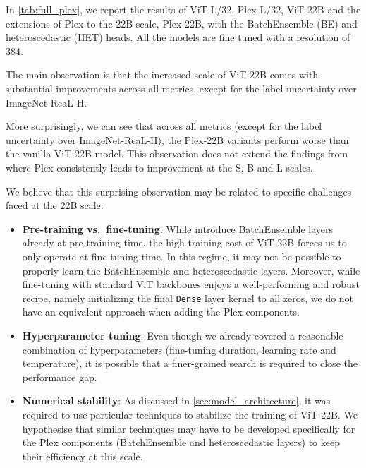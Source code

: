 \documentclass{article}
\begin{document}
In \cref{tab:full_plex}, we report the results of ViT-L/32, Plex-L/32, ViT-22B and the extensions of Plex to the 22B scale, Plex-22B, with the BatchEnsemble (BE) and heteroscedastic (HET) heads. All the models are fine tuned with a resolution of 384. 

The main observation is that the increased scale of ViT-22B comes with substantial improvements across all metrics, except for the label uncertainty over ImageNet-ReaL-H.

More surprisingly, we can see that across all metrics (except for the label uncertainty over ImageNet-ReaL-H), the Plex-22B variants perform worse than the vanilla ViT-22B model. This observation does not extend the findings from \citet{tran2022plex} where Plex consistently leads to improvement at the S, B and L scales.

We believe that this surprising observation may be related to specific challenges faced at the 22B scale:
\begin{itemize}
    \item \textbf{Pre-training vs.~fine-tuning}: While \citet{tran2022plex} introduce BatchEnsemble layers already at pre-training time, the high training cost of ViT-22B forces us to only operate at fine-tuning time. In this regime, it may not be possible to properly learn the BatchEnsemble and heteroscedastic layers. 
    Moreover, while fine-tuning with standard ViT backbones enjoys a well-performing and robust recipe, namely  initializing the final \texttt{Dense} layer kernel to all zeros, we do not have an equivalent approach when adding the Plex components. 
    \item \textbf{Hyperparameter tuning}: Even though we already covered a reasonable combination of hyperparameters (fine-tuning duration, learning rate and temperature), it is possible that a finer-grained search is required to close the performance gap.
    \item \textbf{Numerical stability}: As discussed in \cref{sec:model_architecture}, it was required to use particular techniques to stabilize the training of ViT-22B. We hypothesise that similar techniques may have to be developed specifically for the Plex components (BatchEnsemble and heteroscedastic layers) to keep their efficiency at this scale.
\end{itemize}
\end{document}
